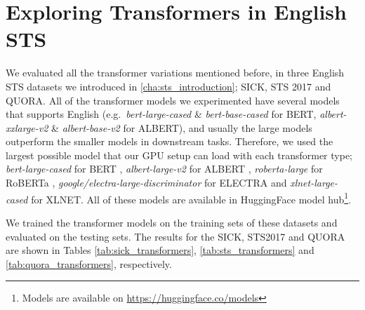 \section{Exploring Transformers in English STS}
\label{sec:transformer_english}
We evaluated all the transformer variations mentioned before, in three English STS datasets we introduced in \ref{cha:sts_introduction}; SICK, STS 2017 and QUORA. All of the transformer models we experimented have several models that supports English (e.g.\ \textit{bert-large-cased} \& \textit{bert-base-cased} for BERT, \textit{albert-xxlarge-v2} \& \textit{albert-base-v2} for ALBERT), and usually the large models outperform the smaller models in downstream tasks. Therefore, we used the largest possible model that our GPU setup can load with each transformer type; \textit{bert-large-cased} for BERT \autocite{devlin-etal-2019-bert}, \textit{albert-large-v2} for ALBERT \autocite{Lan2020ALBERT}, \textit{roberta-large} for RoBERTa \autocite{liu2019roberta}, \textit{google/electra-large-discriminator} for ELECTRA \autocite{Clark2020ELECTRA} and \textit{xlnet-large-cased}  \autocite{yang2019xlnet} for XLNET. All of these models are available in HuggingFace \autocite{wolf-etal-2020-transformers} model hub\footnote{Models are available on \url{https://huggingface.co/models}}.

We trained the transformer models on the training sets of these datasets and evaluated on the testing sets. The results for the SICK, STS2017 and QUORA are shown in Tables \ref{tab:sick_transformers}, \ref{tab:sts_transformers} and \ref{tab:quora_transformers}, respectively. 

\begin{table}[htb]
	\centering
	\caption[Results for SICK with Transformer Models]{Results for SICK dataset with different variants of transformer models. For each variant, Pearson Correlation ($\bm{\rho}$) and Spearman Correlation ($\bm{\tau}$) are reported between the predicted values and the gold labels of the test set. The best result from all of the variations is marked with ${\dagger}$.}  
	\label{tab:sick_transformers}
\end{table}


